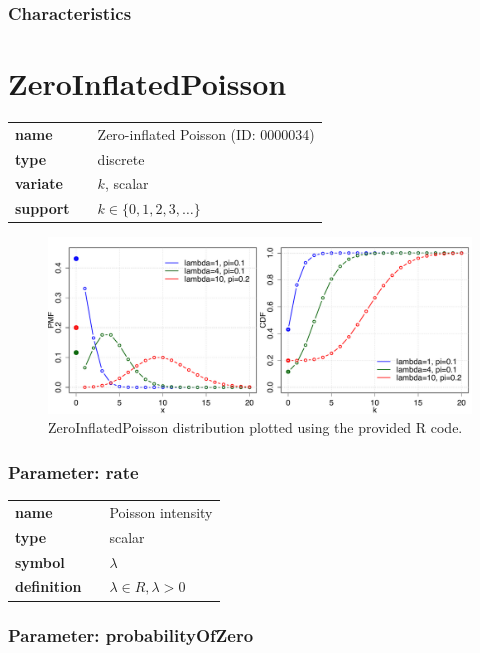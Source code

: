\subsubsection*{Characteristics}
\smallskip
\section*{ZeroInflatedPoisson} 

  \bigskip 

\begin{tabular}{p{2cm}cl}
\textbf{name} & & Zero-inflated Poisson (ID: 0000034)\\ 
 
\textbf{type} & & discrete \\ 

\textbf{variate} & & $k$, scalar \\ 

\textbf{support} & & $k \in \{0,1,2,3,\dots\}$
\end{tabular}

\begin{figure}[ht!]
\centering
  \includegraphics[width=140mm]{pics/ZeroInflatedPoisson.pdf}
 \caption{ZeroInflatedPoisson distribution plotted using the provided R code.}
 \label{fig:ZeroInflatedPoisson}
\end{figure}

\subsubsection*{Parameter: rate}

\noindent\begin{tabular}{p{2cm}cl}
\textbf{name} & & Poisson intensity \\
\textbf{type} & & scalar \\
\textbf{symbol} & & $\lambda$  \\
\textbf{definition} & & $\lambda \in R, \lambda > 0$
\end{tabular}
\subsubsection*{Parameter: probabilityOfZero}

